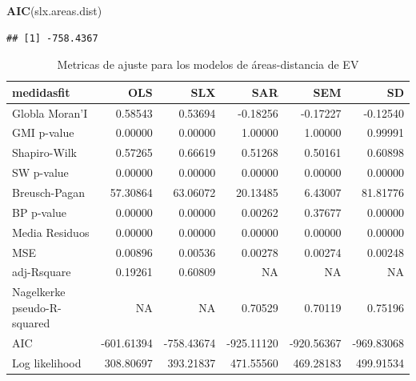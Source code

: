 \documentclass[12pt,]{book}
\newenvironment{Shaded}{\begin{snugshade}}{\end{snugshade}}
\newcommand{\KeywordTok}[1]{\textcolor[rgb]{0.13,0.29,0.53}{\textbf{#1}}}
\newcommand{\NormalTok}[1]{#1}
\begin{document}
\begin{Shaded}
\begin{Highlighting}[]
\KeywordTok{AIC}\NormalTok{(slx.areas.dist)}
\end{Highlighting}
\end{Shaded}

\begin{verbatim}
## [1] -758.4367
\end{verbatim}

\begin{table}

\caption{\label{tab:tabla-comp-modelos-areasdist}Metricas de ajuste para los modelos de áreas-distancia de EV}
\centering
\begin{tabular}[t]{l|r|r|r|r|r}
\hline
medidasfit & OLS & SLX & SAR & SEM & SD\\
\hline
Globla Moran'I & 0.58543 & 0.53694 & -0.18256 & -0.17227 & -0.12540\\
\hline
GMI p-value & 0.00000 & 0.00000 & 1.00000 & 1.00000 & 0.99991\\
\hline
Shapiro-Wilk & 0.57265 & 0.66619 & 0.51268 & 0.50161 & 0.60898\\
\hline
SW p-value & 0.00000 & 0.00000 & 0.00000 & 0.00000 & 0.00000\\
\hline
Breusch-Pagan & 57.30864 & 63.06072 & 20.13485 & 6.43007 & 81.81776\\
\hline
BP p-value & 0.00000 & 0.00000 & 0.00262 & 0.37677 & 0.00000\\
\hline
Media Residuos & 0.00000 & 0.00000 & 0.00000 & 0.00000 & 0.00000\\
\hline
MSE & 0.00896 & 0.00536 & 0.00278 & 0.00274 & 0.00248\\
\hline
adj-Rsquare & 0.19261 & 0.60809 & NA & NA & NA\\
\hline
Nagelkerke pseudo-R-squared & NA & NA & 0.70529 & 0.70119 & 0.75196\\
\hline
AIC & -601.61394 & -758.43674 & -925.11120 & -920.56367 & -969.83068\\
\hline
Log likelihood & 308.80697 & 393.21837 & 471.55560 & 469.28183 & 499.91534\\
\hline
\end{tabular}
\end{table}
\end{document}
